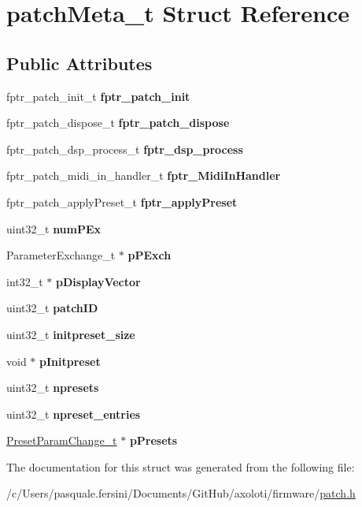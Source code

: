 \hypertarget{structpatchMeta__t}{}\section{patch\+Meta\+\_\+t Struct Reference}
\label{structpatchMeta__t}
\subsection*{Public Attributes}
\begin{DoxyCompactItemize}
\item 
fptr\+\_\+patch\+\_\+init\+\_\+t {\bfseries fptr\+\_\+patch\+\_\+init}
\item 
fptr\+\_\+patch\+\_\+dispose\+\_\+t {\bfseries fptr\+\_\+patch\+\_\+dispose}
\item 
fptr\+\_\+patch\+\_\+dsp\+\_\+process\+\_\+t {\bfseries fptr\+\_\+dsp\+\_\+process}
\item 
fptr\+\_\+patch\+\_\+midi\+\_\+in\+\_\+handler\+\_\+t {\bfseries fptr\+\_\+\+Midi\+In\+Handler}
\item 
fptr\+\_\+patch\+\_\+apply\+Preset\+\_\+t {\bfseries fptr\+\_\+apply\+Preset}
\item 
uint32\+\_\+t {\bfseries num\+P\+Ex}
\item 
Parameter\+Exchange\+\_\+t $\ast$ {\bfseries p\+P\+Exch}
\item 
int32\+\_\+t $\ast$ {\bfseries p\+Display\+Vector}
\item 
uint32\+\_\+t {\bfseries patch\+ID}
\item 
uint32\+\_\+t {\bfseries initpreset\+\_\+size}
\item 
void $\ast$ {\bfseries p\+Initpreset}
\item 
uint32\+\_\+t {\bfseries npresets}
\item 
uint32\+\_\+t {\bfseries npreset\+\_\+entries}
\item 
\hyperlink{structPresetParamChange__t}{Preset\+Param\+Change\+\_\+t} $\ast$ {\bfseries p\+Presets}
\end{DoxyCompactItemize}


The documentation for this struct was generated from the following file\+:\begin{DoxyCompactItemize}
\item 
/c/\+Users/pasquale.\+fersini/\+Documents/\+Git\+Hub/axoloti/firmware/\hyperlink{patch_8h}{patch.\+h}\end{DoxyCompactItemize}
